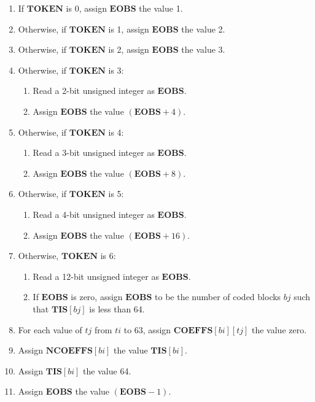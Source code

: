 \documentclass[9pt,letterpaper]{book}
\newcommand{\idx}[1]{{\ensuremath{\mathit{#1}}}}
\newcommand{\bi}{\idx{bi}}
\newcommand{\bj}{\idx{bj}}
\newcommand{\ti}{\idx{ti}}
\newcommand{\tj}{\idx{tj}}
\newcommand{\bitvar}[1]{\ensuremath{\mathbf{\bm{#1}}}}
\newcommand{\locvar}[1]{\ensuremath{\mathrm{#1}}}
\numberwithin{equation}{chapter}
\numberwithin{figure}{chapter}
\numberwithin{table}{chapter}
\begin{document}
\begin{enumerate}
\item
If \bitvar{TOKEN} is 0, assign \bitvar{EOBS} the value 1.
\item
Otherwise, if \bitvar{TOKEN} is 1, assign \bitvar{EOBS} the value 2.
\item
Otherwise, if \bitvar{TOKEN} is 2, assign \bitvar{EOBS} the value 3.
\item
Otherwise, if \bitvar{TOKEN} is 3:
\begin{enumerate}
\item
Read a 2-bit unsigned integer as \bitvar{EOBS}.
\item
Assign \bitvar{EOBS} the value $(\bitvar{EOBS}+4)$.
\end{enumerate}
\item
Otherwise, if \bitvar{TOKEN} is 4:
\begin{enumerate}
\item
Read a 3-bit unsigned integer as \bitvar{EOBS}.
\item
Assign \bitvar{EOBS} the value $(\bitvar{EOBS}+8)$.
\end{enumerate}
\item
Otherwise, if \bitvar{TOKEN} is 5:
\begin{enumerate}
\item
Read a 4-bit unsigned integer as \bitvar{EOBS}.
\item
Assign \bitvar{EOBS} the value $(\bitvar{EOBS}+16)$.
\end{enumerate}
\item
Otherwise, \bitvar{TOKEN} is 6:
\begin{enumerate}
\item
Read a 12-bit unsigned integer as \bitvar{EOBS}.
\item
If \bitvar{EOBS} is zero, assign \bitvar{EOBS} to be the number of coded blocks
 \locvar{\bj} such that $\bitvar{TIS}[\locvar{\bj}]$ is less than 64.
\end{enumerate}
\item
For each value of \locvar{\tj} from $\bitvar{\ti}$ to 63, assign
 $\bitvar{COEFFS}[\bitvar{\bi}][\locvar{\tj}]$ the value zero.
\item
Assign $\bitvar{NCOEFFS}[\bitvar{\bi}]$ the value $\bitvar{TIS}[\bitvar{\bi}]$.
\item
Assign $\bitvar{TIS}[\bitvar{\bi}]$ the value 64.
\item
Assign \bitvar{EOBS} the value $(\bitvar{EOBS}-1)$.
\end{enumerate}
\end{document}

